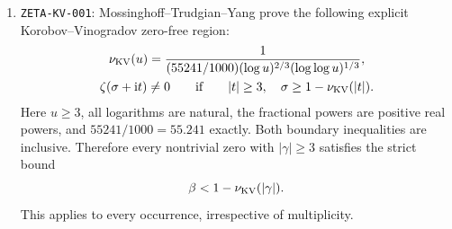 \documentclass[11pt]{article}
\newcommand{\ii}{\mathrm i}
\begin{document}
\begin{enumerate}
sector bounded away from the negative real axis and from zero;
\(\psi=\Gamma'/\Gamma\) and \(\log z\) is principal.
In particular fix an effective constant \(C_\psi\) such that
\begin{equation}\label{eq:psi-bound}
 |\psi(z)-\log z|\leq C_\psi/|z|
 \quad (\Re z\geq3/2).
\end{equation}
The Euler--Maclaurin proof of that theorem yields an effective constant;
we do not optimize or numerically evaluate it here.
\item \texttt{ZETA-KV-001}\label{inp:kv}:
Mossinghoff--Trudgian--Yang \cite[Theorem 1.1, (1.5), p.~2]{MTY2024}
prove the following explicit Korobov--Vinogradov zero-free region:
\begin{equation}\label{eq:kv-input}
 \begin{gathered}
 \nu_{\rm KV}(u)=
 \frac{1}{(55241/1000)(\log u)^{2/3}(\log\log u)^{1/3}},\\
 \zeta(\sigma+\ii t)\ne0\qquad\text{if}\qquad
 |t|\geq3,\quad \sigma\geq1-\nu_{\rm KV}(|t|).
 \end{gathered}
\end{equation}
Here \(u\geq3\), all logarithms are natural, the fractional powers
are positive real powers, and \(55241/1000=55.241\) exactly.
Both boundary inequalities are inclusive. Therefore every nontrivial
zero with \(|\gamma|\geq3\) satisfies the strict bound
\begin{equation}\label{eq:kv-zero-bound}
 \beta<1-\nu_{\rm KV}(|\gamma|).
\end{equation}
This applies to every occurrence, irrespective of multiplicity.


\end{enumerate}
\end{document}
